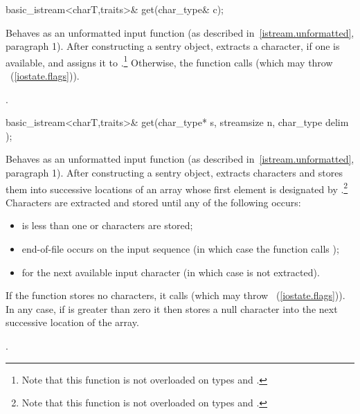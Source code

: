 %
%
\begin{itemdecl}
basic_istream<charT,traits>& get(char_type& c);
\end{itemdecl}

\begin{itemdescr}
\pnum
\effects
Behaves as an unformatted input function
(as described in~\ref{istream.unformatted}, paragraph 1).
After constructing a sentry object, extracts
a character, if one is available, and assigns it to .\footnote{Note
that this function is not overloaded on types
and
.}
Otherwise, the function calls
(which may throw
~(\ref{iostate.flags})).

\pnum
\returns
{}.
\end{itemdescr}

%
%
\begin{itemdecl}
basic_istream<charT,traits>& get(char_type* s, streamsize n,
                  char_type delim );
\end{itemdecl}

\begin{itemdescr}
\pnum
\effects
Behaves as an unformatted input function
(as described in~\ref{istream.unformatted}, paragraph 1).
After constructing a sentry object, extracts
characters and stores them
into successive locations of an array whose first element is designated by
.\footnote{Note that this function is not overloaded on types
and
.}
Characters are extracted and stored until any of the following occurs:
\begin{itemize}
\item
{} is less than one or 
characters are stored;
\item
end-of-file occurs on the input sequence
(in which case the function calls
);
\item
{}
for the next available input
character 
(in which case  is not extracted).
\end{itemize}

\pnum
If the function stores no characters, it calls
(which may throw
~(\ref{iostate.flags})).
In any case, if  is greater than zero it then stores a null character
into the next successive location of the array.

\pnum
\returns
{}.
\end{itemdescr}

